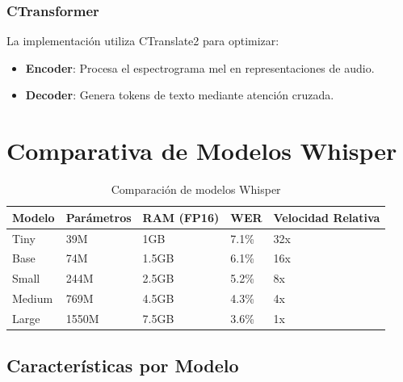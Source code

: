 \subsubsection{CTransformer}
La implementación utiliza CTranslate2 para optimizar:
\begin{itemize}
	\item \textbf{Encoder}: Procesa el espectrograma mel en representaciones de audio.
	\item \textbf{Decoder}: Genera tokens de texto mediante atención cruzada.
\end{itemize}

\section{Comparativa de Modelos Whisper}
\label{sec:whisper-models-comparison}

\begin{table}[H]
	\caption{Comparación de modelos Whisper}
	\label{tab:whisper-models}
	\begin{tabular}{|p{2cm}|p{2cm}|p{3cm}|p{3cm}|p{3cm}|}
		\hline
		\textbf{Modelo} & \textbf{Parámetros} & \textbf{RAM (FP16)} & \textbf{WER} & \textbf{Velocidad Relativa} \\
		\hline
		Tiny            & 39M                 & 1GB                 & 7.1\%        & 32x                         \\
		\hline
		Base            & 74M                 & 1.5GB               & 6.1\%        & 16x                         \\
		\hline
		Small           & 244M                & 2.5GB               & 5.2\%        & 8x                          \\
		\hline
		Medium          & 769M                & 4.5GB               & 4.3\%        & 4x                          \\
		\hline
		Large           & 1550M               & 7.5GB               & 3.6\%        & 1x                          \\
		\hline
	\end{tabular}
\end{table}

\subsection{Características por Modelo}
\label{subsec:model-features}

